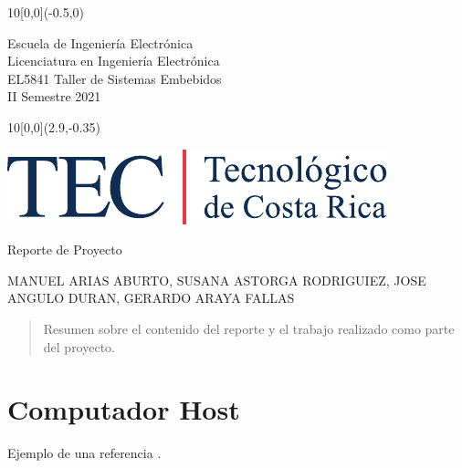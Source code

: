 \documentclass[12pt,letterpaper]{article}
\newcommand{\EstudianteA}{MANUEL ARIAS ABURTO}
\newcommand{\EstudianteB}{SUSANA ASTORGA RODRIGUIEZ}
\newcommand{\EstudianteC}{JOSE ANGULO DURAN}
\newcommand{\EstudianteD}{GERARDO ARAYA FALLAS}
\begin{document}
	
\graphicspath{{./}{./fig/}}


\begin{textblock}{10}[0,0](-0.5,0)
	\begin{flushleft}
		\large 
		Escuela de Ingeniería Electrónica \\
		Licenciatura en Ingeniería Electrónica \\
		EL5841 Taller de Sistemas Embebidos \\
		II Semestre 2021
	\end{flushleft}
\end{textblock}

\begin{textblock}{10}[0,0](2.9,-0.35)
	\begin{flushright}
		\includegraphics[scale=0.8]{Firma_TEC-4.pdf}
	\end{flushright}
\end{textblock}

\begin{center}
	\vspace{3.5cm}
	{\Large\color{tecRojo} Reporte de Proyecto }
	\par\vspace{1.0cm}
	{\LARGE\bf\color{tecAzul}{Proyecto 1: Diseño de sistemas usando High-Level
Synthesis
}}
	\par\vspace{1.0cm}
	{\large{\EstudianteA, \EstudianteB, \EstudianteC, \EstudianteD} 
	\vspace{0.75cm}}
\end{center}



\begin{abstract}
Resumen sobre el contenido del reporte y el trabajo realizado como parte del 
proyecto.
\end{abstract}


\section{Computador Host}
Ejemplo de una referencia \cite{legup}.
\end{document}
